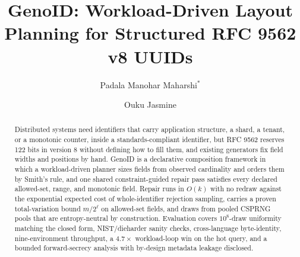 \documentclass{svproc}
\begin{document}
\mainmatter

\title{GenoID: Workload-Driven Layout Planning for Structured RFC 9562 v8 UUIDs}


\author{Padala Manohar Maharshi$^{*}$ \and Ouku Jasmine}



\maketitle              %

\begin{abstract}
Distributed systems need identifiers that carry application structure, a shard, a tenant, or a monotonic counter, inside a standards-compliant identifier, but RFC 9562 reserves 122 bits in version 8 without defining how to fill them, and existing generators fix field widths and positions by hand. GenoID is a declarative composition framework in which a workload-driven planner sizes fields from observed cardinality and orders them by Smith's rule, and one shared constraint-guided repair pass satisfies every declared allowed-set, range, and monotonic field. Repair runs in $O(k)$ with no redraw against the exponential expected cost of whole-identifier rejection sampling, carries a proven total-variation bound $m/2^\ell$ on allowed-set fields, and draws from pooled CSPRNG pools that are entropy-neutral by construction. Evaluation covers $10^8$-draw uniformity matching the closed form, NIST/dieharder sanity checks, cross-language byte-identity, nine-environment throughput, a $4.7\times$ workload-loop win on the hot query, and a bounded forward-secrecy analysis with by-design metadata leakage disclosed.
\end{abstract}
\end{document}
